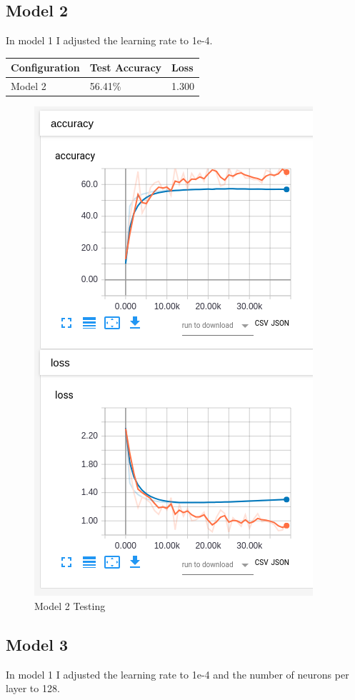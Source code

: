 \documentclass[12pt, letter]{article}
\begin{document}
  \subsection{Model 2}
  In model 1 I adjusted the learning rate to {1e-4}. \\

  \begin{tabular}{lll}
    Configuration  & Test Accuracy & Loss  \\
    \hline
    Model 2        & 56.41\%       & 1.300
  \end{tabular}

  \begin{figure}[H]
    \centering
    \includegraphics[width=0.8 \textwidth]{lr1e4}
    \caption{Model 2 Testing}
    \label{fig:eg}
  \end{figure}
  \subsection{Model 3}
  In model 1 I adjusted the learning rate to {1e-4} and the number of neurons
  per layer to 128. \\
\end{document}
